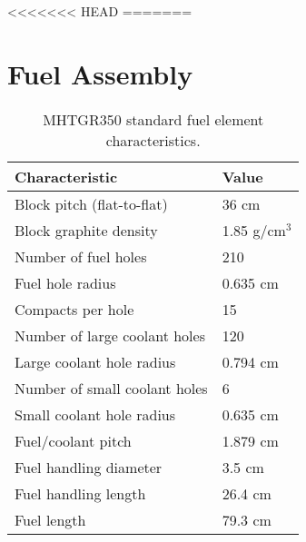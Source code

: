 \documentclass[11pt,letterpaper]{article}
\begin{document}
<<<<<<< HEAD
=======
\section{Fuel Assembly}

	\begin{table}[htbp!]
		\centering
	    \caption{MHTGR350 standard fuel element characteristics.}
	    \label{tab:scharacteristics}
		\begin{tabular}{l|l}
		\hline
		Characteristic                   & Value         \\ \hline
		Block pitch (flat-to-flat)       & 36 cm         \\
		Block graphite density           & 1.85 g/cm$^3$ \\
		Number of fuel holes             & 210           \\
		Fuel hole radius                 & 0.635 cm      \\
		Compacts per hole                & 15            \\
		Number of large coolant holes    & 120           \\
		Large coolant hole radius        & 0.794 cm      \\
		Number of small coolant holes    & 6             \\
		Small coolant hole radius        & 0.635 cm      \\
		Fuel/coolant pitch               & 1.879 cm      \\
		Fuel handling diameter           & 3.5 cm        \\ 
		Fuel handling length             & 26.4 cm       \\ 
		Fuel length                      & 79.3 cm       \\ \hline
		\end{tabular}
	\end{table}
\end{document}

